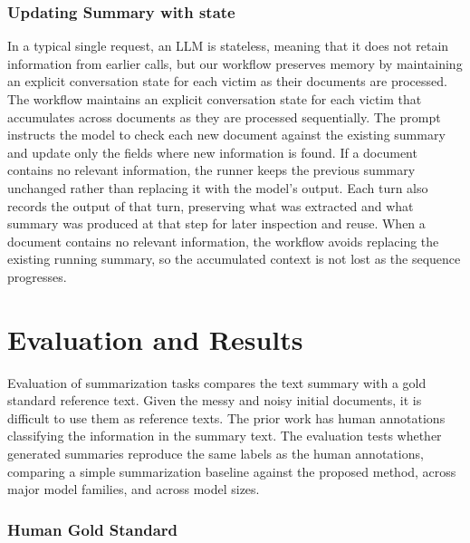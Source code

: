 \documentclass{article}
\begin{document}
\subsubsection{Updating Summary with
state}\label{updating-summary-with-state}

In a typical single request, an LLM is stateless, meaning that it does
not retain information from earlier calls, but our workflow preserves
memory by maintaining an explicit conversation state for each victim as
their documents are processed. The workflow maintains an explicit
conversation state for each victim that accumulates across documents as
they are processed sequentially. The prompt instructs the model to check
each new document against the existing summary and update only the
fields where new information is found. If a document contains no
relevant information, the runner keeps the previous summary unchanged
rather than replacing it with the model's output. Each turn also records
the output of that turn, preserving what was extracted and what summary
was produced at that step for later inspection and reuse. When a
document contains no relevant information, the workflow avoids replacing
the existing running summary, so the accumulated context is not lost as
the sequence progresses.

\section{Evaluation and Results}\label{eval_results}

Evaluation of summarization tasks compares the
text summary with a gold standard reference text. Given the messy and noisy initial documents, it is difficult to
use them as reference texts.  The prior work has human
annotations classifying the information in the 
summary text. The evaluation tests whether generated summaries reproduce
the same labels as the human annotations, comparing a simple
summarization baseline against the proposed method, across major model
families, and across model sizes.

\subsubsection{Human Gold Standard}\label{human-gold-standard}
\end{document}
